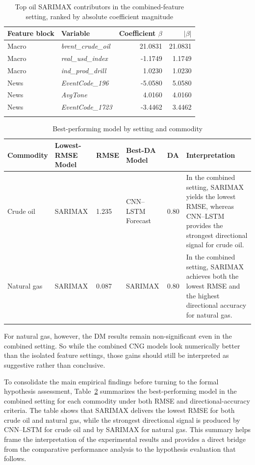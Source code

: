 \documentclass[pdflatex,sn-mathphys-num]{sn-jnl}%
\theoremstyle{thmstyleone}%
\theoremstyle{thmstyletwo}%
\theoremstyle{thmstylethree}%
\begin{document}
\begin{table}[h]
\centering
\small
\caption{Top oil SARIMAX contributors in the combined-feature setting, ranked by absolute coefficient magnitude}
\label{tab:feature_contribution_summary}
\begin{tabular}{@{}llrr@{}}
\toprule
Feature block & Variable & Coefficient $\beta$ & $|\beta|$ \\
\midrule
Macro & \textit{brent\_crude\_oil} & 21.0831 & 21.0831 \\
Macro & \textit{real\_usd\_index} & -1.1749 & 1.1749 \\
Macro & \textit{ind\_prod\_drill} & 1.0230 & 1.0230 \\
News & \textit{EventCode\_196} & -5.0580 & 5.0580 \\
News & \textit{AvgTone} & 4.0160 & 4.0160 \\
News & \textit{EventCode\_1723} & -3.4462 & 3.4462 \\
\botrule
\end{tabular}
\end{table}

\begin{table}[h]
\centering
\small
\caption{Best-performing model by setting and commodity}
\label{tab:summary_best_models}
\begin{tabular}{@{}p{1.5cm}p{1.8cm}p{0.8cm}p{1.8cm}p{0.7cm}p{3.8cm}@{}}
\toprule
Commodity & Lowest-RMSE Model & RMSE & Best-DA Model & DA & Interpretation \\
\midrule
Crude oil & SARIMAX & 1.235 & CNN--LSTM Forecast & 0.80 & In the combined setting, SARIMAX yields the lowest RMSE, whereas CNN--LSTM provides the strongest directional signal for crude oil. \\
Natural gas & SARIMAX & 0.087 & SARIMAX & 0.80 & In the combined setting, SARIMAX achieves both the lowest RMSE and the highest directional accuracy for natural gas. \\
\botrule
\end{tabular}
\end{table}

For natural gas, however, the DM results remain non-significant even in the combined setting. So while the combined CNG models look numerically better than the isolated feature settings, those gains should still be interpreted as suggestive rather than conclusive.

To consolidate the main empirical findings before turning to the formal hypothesis assessment, Table~\ref{tab:summary_best_models} summarizes the best-performing model in the combined setting for each commodity under both RMSE and directional-accuracy criteria. The table shows that SARIMAX delivers the lowest RMSE for both crude oil and natural gas, while the strongest directional signal is produced by CNN--LSTM for crude oil and by SARIMAX for natural gas. This summary helps frame the interpretation of the experimental results and provides a direct bridge from the comparative performance analysis to the hypothesis evaluation that follows.
\end{document}
